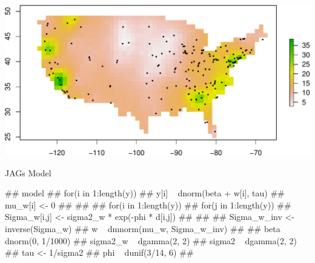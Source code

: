 \documentclass[11pt,ignorenonframetext,]{beamer}
\newenvironment{Shaded}{}{}
\newcommand{\KeywordTok}[1]{\textcolor[rgb]{0.00,0.44,0.13}{\textbf{#1}}}
\newcommand{\DataTypeTok}[1]{\textcolor[rgb]{0.56,0.13,0.00}{#1}}
\newcommand{\DecValTok}[1]{\textcolor[rgb]{0.25,0.63,0.44}{#1}}
\newcommand{\FloatTok}[1]{\textcolor[rgb]{0.25,0.63,0.44}{#1}}
\newcommand{\StringTok}[1]{\textcolor[rgb]{0.25,0.44,0.63}{#1}}
\newcommand{\OperatorTok}[1]{\textcolor[rgb]{0.40,0.40,0.40}{#1}}
\newcommand{\NormalTok}[1]{#1}
\let\oldShaded\Shaded
\let\endoldShaded\endShaded
\renewenvironment{Shaded}{\footnotesize\begin{spacing}{0.9}\oldShaded}{\endoldShaded\end{spacing}}
\let\oldverbatim\verbatim
\let\endoldverbatim\endverbatim
\renewenvironment{verbatim}{\footnotesize\begin{spacing}{0.9}\oldverbatim}{\endoldverbatim\end{spacing}}
\begin{document}
\begin{frame}[fragile]{}

\begin{Shaded}
\end{Shaded}

\includegraphics{Lec20_files/figure-beamer/unnamed-chunk-26-1.pdf}

\end{frame}

\begin{frame}[fragile]{JAGs Model}

\begin{verbatim}
## model{
##   for(i in 1:length(y)){
##     y[i] ~ dnorm(beta + w[i], tau)
##     mu_w[i] <- 0
##   }
##  
##   for(i in 1:length(y)){
##     for(j in 1:length(y)){
##       Sigma_w[i,j] <- sigma2_w * exp(-phi * d[i,j])
##     }
##   }
##   Sigma_w_inv <- inverse(Sigma_w)
##   w ~ dmnorm(mu_w, Sigma_w_inv)
## 
##   beta ~ dnorm(0, 1/1000)
##   sigma2_w ~ dgamma(2, 2)
##   sigma2 ~ dgamma(2, 2)
##   tau <- 1/sigma2
##   phi ~ dunif(3/14, 6)
## }
\end{verbatim}

\end{frame}
\end{document}
